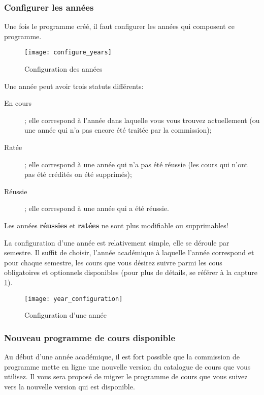 \subsubsection{Configurer les années}
Une fois le programme créé, il faut configurer les années qui composent ce programme.
\begin{figure}[htb]
\centering 
\caption{Configuration des années}
\label{fig:configure_years}
\texttt{[image: configure\_years]}
\end{figure}

Une année peut avoir trois statuts différents:
\begin{description}
\item[En cours] ; elle correspond à l'année dans laquelle vous vous trouvez actuellement (ou une année qui n'a pas encore été traitée par la commission);
\item[Ratée] ; elle correspond à une année qui n'a pas été réussie (les cours qui n'ont pas été crédités on été supprimés);
\item[Réussie] ; elle correspond à une année qui a été réussie.
\end{description}

Les années \textbf{réussies} et \textbf{ratées} ne sont plus modifiable ou supprimables!

La configuration d'une année est relativement simple, elle se déroule par semestre. Il suffit de choisir, l'année académique à laquelle l'année correspond et pour chaque semestre, les cours que vous désirez suivre parmi les cous obligatoires et optionnels disponibles (pour plus de détails, se référer à la capture \ref{fig:configure_years}).

\begin{figure}[htb]
\centering
\caption{Configuration d'une année}
\label{fig:configure_year}
\texttt{[image: year\_configuration]}
\end{figure}



\subsubsection{Nouveau programme de cours disponible}
Au début d'une année académique, il est fort possible que la commission de programme mette en ligne une nouvelle version du catalogue de cours que vous utilisez. Il vous sera proposé de migrer le programme de cours que vous suivez vers la nouvelle version qui est disponible. 

